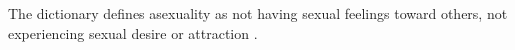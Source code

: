 The dictionary defines asexuality as not having sexual feelings toward others, 
not experiencing sexual desire or attraction \cite{asexual-def}.

